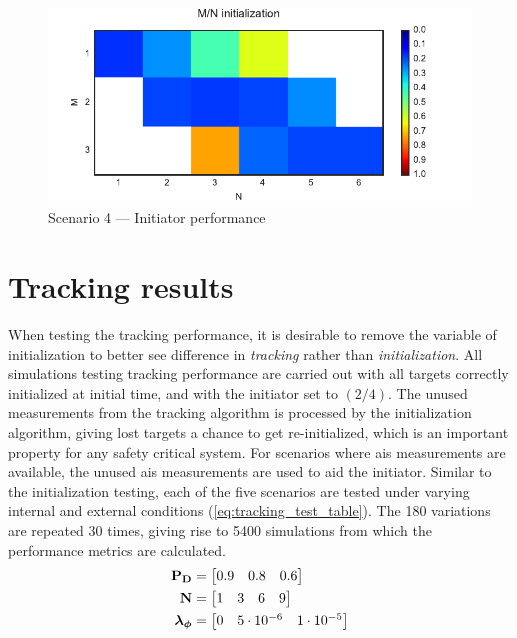 \begin{figure}
 \centering
 \includegraphics{Figures/plots/Scenario4_Init-Performance.pdf}
 \caption{Scenario 4 --- Initiator performance}\label{fig:init_performance_scenario4}
\end{figure}
\clearpage{}

\section{Tracking results}
When testing the tracking performance, it is desirable to remove the variable of initialization to better see difference in \emph{tracking} rather than \emph{initialization}. All simulations testing tracking performance are carried out with all targets correctly initialized at initial time, and with the initiator set to \( (2/4) \). The unused measurements from the tracking algorithm is processed by the initialization algorithm, giving lost targets a chance to get re-initialized, which is an important property for any safety critical system. For scenarios where \gls{ais} measurements are available, the unused \gls{ais} measurements are used to aid the initiator. Similar to the initialization testing, each of the five scenarios are tested under varying internal and external conditions (\ref{eq:tracking_test_table}). The 180 variations are repeated 30 times, giving rise to 5400 simulations from which the performance metrics are calculated. 
\begin{equation}\label{eq:tracking_test_table}
\begin{split}
\boldsymbol{\mathbf{P_D}} &= \begin{bmatrix} 0.9 & 0.8 & 0.6 \end{bmatrix} \\
\boldsymbol{\mathbf{N}} &= \begin{bmatrix} 1 & 3 & 6 & 9 \end{bmatrix} \\
\boldsymbol{\mathbf{\lambda_\phi}} &= \begin{bmatrix} 0 & 5\cdot10^{-6} & 1\cdot10^{-5} \end{bmatrix}
\end{split}
\end{equation}


